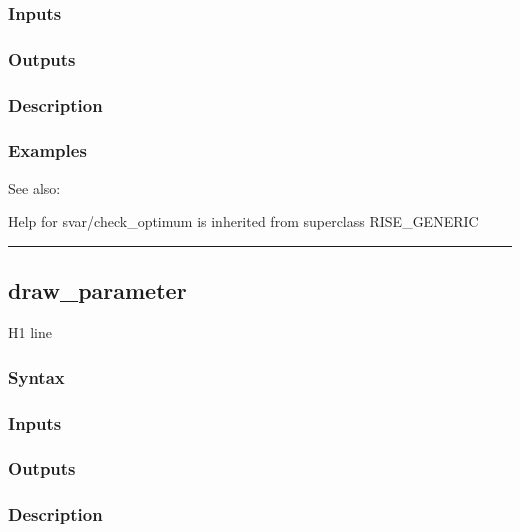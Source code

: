 \documentclass[letterpaper,10pt,english]{sphinxmanual}
\begin{document}
\subsubsection{Inputs}
\label{classes/models/@svar/svar:inputs}

\subsubsection{Outputs}
\label{classes/models/@svar/svar:outputs}

\subsubsection{Description}
\label{classes/models/@svar/svar:description}

\subsubsection{Examples}
\label{classes/models/@svar/svar:examples}
See also:

Help for svar/check\_optimum is inherited from superclass RISE\_GENERIC


\bigskip\hrule{}\bigskip



\subsection{draw\_parameter}
\label{classes/models/@svar/svar:id2}\label{classes/models/@svar/svar:draw-parameter}
H1 line


\subsubsection{Syntax}
\label{classes/models/@svar/svar:id3}

\subsubsection{Inputs}
\label{classes/models/@svar/svar:id4}

\subsubsection{Outputs}
\label{classes/models/@svar/svar:id5}

\subsubsection{Description}
\label{classes/models/@svar/svar:id6}
\end{document}

